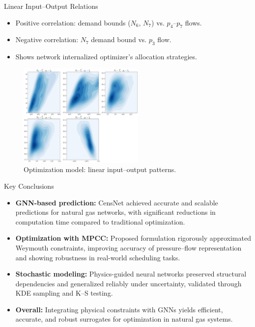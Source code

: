 \documentclass[hyperref={colorlinks,citecolor=blue,linkcolor=blue,urlcolor=blue}]{beamer}
\begin{document}
\begin{frame}{Linear Input--Output Relations}
\scriptsize
    \begin{itemize}
        \item Positive correlation: demand bounds ($N_6$, $N_7$) vs. $p_4$--$p_7$ flows.
        \item Negative correlation: $N_7$ demand bound vs. $p_3$ flow.
        \item Shows network internalized optimizer’s allocation strategies.
    \end{itemize}
    \begin{figure}
        \includegraphics[width=0.55\textwidth]{figures/inputs_outputs_2.png}
        \caption{\scriptsize Optimization model: linear input–output patterns.}
    \end{figure}
\end{frame}


\begin{frame}{Key Conclusions}
    \begin{itemize}
        \item \textbf{GNN-based prediction:} CensNet achieved accurate and scalable predictions for natural gas networks, with significant reductions in computation time compared to traditional optimization.
        \item \textbf{Optimization with MPCC:} Proposed formulation rigorously approximated Weymouth constraints, improving accuracy of pressure–flow representation and showing robustness in real-world scheduling tasks.
        \item \textbf{Stochastic modeling:} Physics-guided neural networks preserved structural dependencies and generalized reliably under uncertainty, validated through KDE sampling and K–S testing.
        \item \textbf{Overall:} Integrating physical constraints with GNNs yields efficient, accurate, and robust surrogates for optimization in natural gas systems.
    \end{itemize}
\end{frame}
\end{document}
